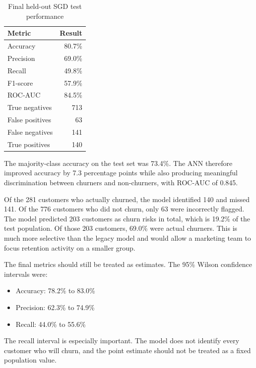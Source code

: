 \documentclass[11pt]{article}
\begin{document}
\begin{table}[H]
\centering
\caption{Final held-out SGD test performance}
\label{tab:final}
\begin{tabular}{lr}
\toprule
\textbf{Metric} & \textbf{Result}\\
\midrule
Accuracy & 80.7\%\\
Precision & 69.0\%\\
Recall & 49.8\%\\
F1-score & 57.9\%\\
ROC-AUC & 84.5\%\\
True negatives & 713\\
False positives & 63\\
False negatives & 141\\
True positives & 140\\
\bottomrule
\end{tabular}
\end{table}

The majority-class accuracy on the test set was 73.4\%. The ANN therefore improved accuracy by 7.3 percentage points while also producing meaningful discrimination between churners and non-churners, with ROC-AUC of 0.845.

Of the 281 customers who actually churned, the model identified 140 and missed 141. Of the 776 customers who did not churn, only 63 were incorrectly flagged. The model predicted 203 customers as churn risks in total, which is 19.2\% of the test population. Of those 203 customers, 69.0\% were actual churners. This is much more selective than the legacy model and would allow a marketing team to focus retention activity on a smaller group.

The final metrics should still be treated as estimates. The 95\% Wilson confidence intervals were:

\begin{itemize}[leftmargin=*]
    \item Accuracy: 78.2\% to 83.0\%
    \item Precision: 62.3\% to 74.9\%
    \item Recall: 44.0\% to 55.6\%
\end{itemize}

The recall interval is especially important. The model does not identify every customer who will churn, and the point estimate should not be treated as a fixed population value.
\end{document}
